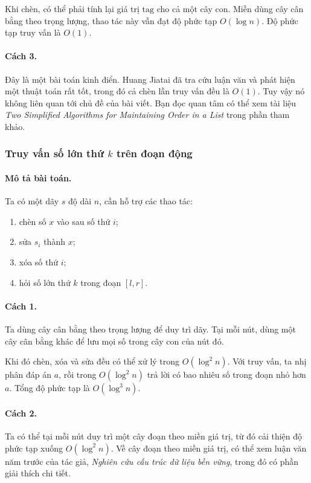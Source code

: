 \documentclass[11pt]{article}
\begin{document}
Khi chèn, có thể phải tính lại giá trị \(\mathrm{tag}\) cho cả một cây con.
Miễn dùng cây cân bằng theo trọng lượng, thao tác này vẫn đạt độ phức tạp
\(O(\log n)\). Độ phức tạp truy vấn là \(O(1)\).

\paragraph{Cách 3.}
Đây là một bài toán kinh điển. Huang Jiatai đã tra cứu luận văn và phát hiện
một thuật toán rất tốt, trong đó cả chèn lẫn truy vấn đều là \(O(1)\). Tuy
vậy nó không liên quan tới chủ đề của bài viết. Bạn đọc quan tâm có thể xem
tài liệu \emph{Two Simplified Algorithms for Maintaining Order in a List}
trong phần tham khảo.

\subsubsection{\texorpdfstring{Truy vấn số lớn thứ \(k\) trên đoạn động}{Truy
vấn số lớn thứ k trên đoạn động}}

\paragraph{Mô tả bài toán.}
Ta có một dãy \(s\) độ dài \(n\), cần hỗ trợ các thao tác:
\begin{enumerate}
  \item chèn số \(x\) vào sau số thứ \(i\);
  \item sửa \(s_i\) thành \(x\);
  \item xóa số thứ \(i\);
  \item hỏi số lớn thứ \(k\) trong đoạn \([l,r]\).
\end{enumerate}

\paragraph{Cách 1.}
Ta dùng cây cân bằng theo trọng lượng để duy trì dãy. Tại mỗi nút, dùng một
cây cân bằng khác để lưu mọi số trong cây con của nút đó.

Khi đó chèn, xóa và sửa đều có thể xử lý trong \(O(\log^2 n)\). Với truy
vấn, ta nhị phân đáp án \(a\), rồi trong \(O(\log^2 n)\) trả lời có bao
nhiêu số trong đoạn nhỏ hơn \(a\). Tổng độ phức tạp là \(O(\log^3 n)\).

\paragraph{Cách 2.}
Ta có thể tại mỗi nút duy trì một cây đoạn theo miền giá trị, từ đó cải thiện
độ phức tạp xuống \(O(\log^2 n)\). Về cây đoạn theo miền giá trị, có thể xem
luận văn năm trước của tác giả, \emph{Nghiên cứu cấu trúc dữ liệu bền vững},
trong đó có phần giải thích chi tiết.
\end{document}
